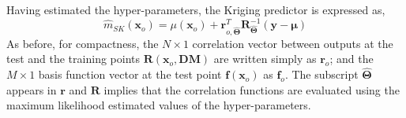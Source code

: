 

Having estimated the hyper-parameters, the Kriging predictor is expressed as,
\begin{equation}
	\hat{m}_{SK}(\mathbf{x}_o) =  \mu(\mathbf{x}_o) + \mathbf{r}^T_{o,\hat{\boldsymbol{\Theta}}} \mathbf{R}^{-1}_{\hat{\boldsymbol{\Theta}}} (\mathbf{y} - \boldsymbol{\mu})
\label{eq:sk_predictor_ml}
\end{equation}
As before, for compactness, the $N \times 1$ correlation vector between outputs at the test and the training points $\mathbf{R}(\mathbf{x}_o, \mathbf{DM})$ are written simply as $\mathbf{r}_o$;
and the $M \times 1$ basis function vector at the test point $\mathbf{f}(\mathbf{x}_o)$ as $\mathbf{f}_o$.
The subscript $\hat{\boldsymbol{\Theta}}$ appears in $\mathbf{r}$ and $\mathbf{R}$ implies that the correlation functions are evaluated using the maximum likelihood estimated values of the hyper-parameters.

